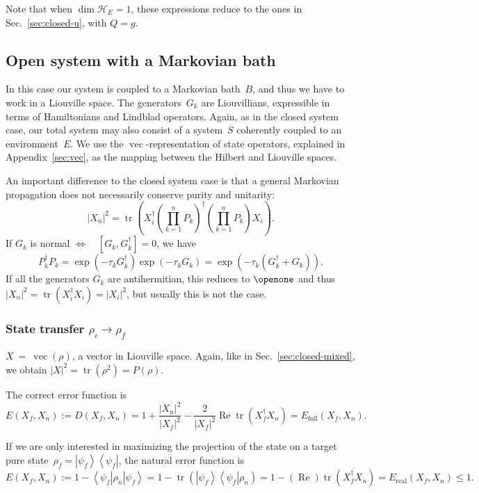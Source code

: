 \documentclass[aps, pra, a4paper, longbibliography]{revtex4}
\newcommand{\I}{\openone}
\newcommand{\be}{\begin{equation}}
\newcommand{\ee}{\end{equation}}
\newcommand{\eq}{\Leftrightarrow}
\newcommand{\ket}[1]{\left| #1 \right \rangle}
\newcommand{\bra}[1]{\left \langle #1 \right|}
\newcommand{\ketbra}[2]{\left| #1 \right \rangle \left \langle #2 \right|}
\newcommand{\hilb}[1]{\mathcal{#1}}
\DeclareMathOperator{\tr}{tr}
\DeclareMathOperator{\re}{Re}
\DeclareMathOperator{\cvec}{vec}
\begin{document}
Note that when $\dim \hilb{H}_E = 1$, these expressions reduce to the ones in Sec.~\ref{sec:closed-u},
with $Q = g$.





\subsection{Open system with a Markovian bath}

In this case our system is coupled to a Markovian bath~$B$, and thus
we have to work in a Liouville space.
The generators~$G_k$ are Liouvillians, expressible in terms of
Hamiltonians and Lindblad operators.
Again, as in the closed system case, our total system may also consist of 
a system~$S$ coherently coupled to an environment~$E$.
We use the $\cvec$-representation of state
operators, explained in Appendix~\ref{sec:vec},
as the mapping between the Hilbert and Liouville spaces.

An important difference to the closed system case is that a general Markovian propagation
does not necessarily conserve purity and unitarity:
\be
|X_n|^2 = \tr\left(X_i^\dagger \left(\prod_{k=1}^{n} P_k\right)^\dagger \left(\prod_{k=1}^{n} P_k\right) X_i\right).
\ee
If $G_k$ is normal $\eq \quad [G_k, G^\dagger_k] = 0$, we have
\be
P_k^\dagger P_k
= \exp(-\tau_k G^\dagger_k) \exp(-\tau_k G_k)
= \exp(-\tau_k (G_k^\dagger + G_k)).
\ee
If all the generators $G_k$ are antihermitian, this reduces to $\I$ and thus
$|X_n|^2 = \tr(X_i^\dagger X_i) = |X_i|^2$, but usually this is not
the case.



\subsubsection{State transfer $\rho_i \to \rho_f$}

$X~=~\cvec(\rho)$, a vector in Liouville space. Again, like in
Sec.~\ref{sec:closed-mixed}, we obtain
$|X|^2 = \tr(\rho^2) = P(\rho)$.

The correct error function is
\be
E(X_f, X_n)
:= D(X_f, X_n)
= 1 +\frac{|X_n|^2}{|X_f|^2} -\frac{2}{|X_f|^2} \re \tr(X_f^\dagger X_n)
= E_\text{full}(X_f, X_n).
\ee

If we are only interested in maximizing the projection of
the state on a target pure state~$\rho_f = \ketbra{\psi_f}{\psi_f}$, the natural error
function is
\be
E(X_f, X_n)
:= 1 -\bra{\psi_f} \rho_n \ket{\psi_f}
= 1 -\tr\left(\ketbra{\psi_f}{\psi_f} \rho_n \right)
= 1 -(\re) \tr\left(X_f^\dagger X_n\right)
= E_\text{real}(X_f, X_n) \le 1.
\ee
\end{document}

